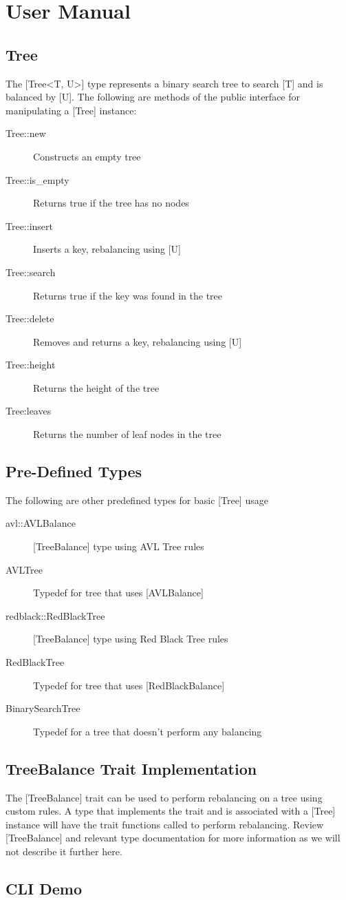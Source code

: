 \documentclass[12pt, letterpaper]{article}
\begin{document}
\pagebreak

\section{User Manual}

\subsection{Tree}
The [Tree\textless T, U\textgreater ] type represents a binary search tree to search [T] and is balanced by [U].
The following are methods of the public interface for manipulating a [Tree] instance:
\begin{description}
    \item[Tree::new] Constructs an empty tree
    \item[Tree::is\_empty] Returns true if the tree has no nodes
    \item[Tree::insert] Inserts a key, rebalancing using [U]
    \item[Tree::search] Returns true if the key was found in the tree
    \item[Tree::delete] Removes and returns a key, rebalancing using [U]
    \item[Tree::height] Returns the height of the tree
    \item[Tree:leaves] Returns the number of leaf nodes in the tree   
\end{description}

\subsection{Pre-Defined Types}
The following are other predefined types for basic [Tree] usage
\begin{description}
    \item[avl::AVLBalance] [TreeBalance] type using AVL Tree rules
    \item[AVLTree] Typedef for tree that uses [AVLBalance]
    \item[redblack::RedBlackTree] [TreeBalance] type using Red Black Tree rules
    \item[RedBlackTree] Typedef for tree that uses [RedBlackBalance]
    \item[BinarySearchTree] Typedef for a tree that doesn't perform any balancing
\end{description}

\subsection{TreeBalance Trait Implementation}
The [TreeBalance] trait can be used to perform rebalancing on a tree using custom rules.
A type that implements the trait and is associated with a [Tree] instance will have the trait functions called
to perform rebalancing.  Review [TreeBalance] and relevant type documentation for more information as we will not
describe it further here.

\subsection{CLI Demo}
\end{document}
